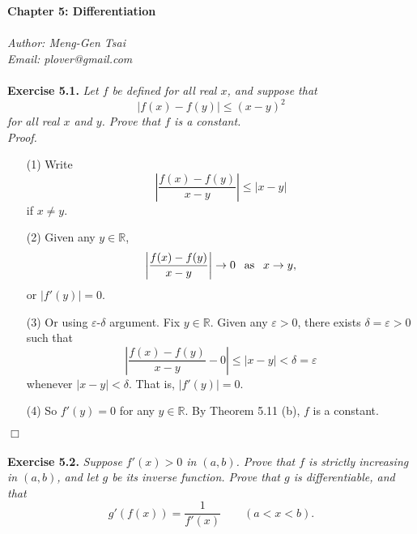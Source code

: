 \documentclass{article}
\begin{document}
\textbf{\Large Chapter 5: Differentiation} \\\\



\emph{Author: Meng-Gen Tsai} \\
\emph{Email: plover@gmail.com} \\\\






\textbf{Exercise 5.1.}
\emph{Let $f$ be defined for all real $x$, and suppose that
$$|f(x) - f(y)| \leq (x - y)^2$$
for all real $x$ and $y$. Prove that $f$ is a constant.} \\

\emph{Proof.}
\begin{enumerate}
\item[(1)]
Write
\[
  \left| \frac{f(x) - f(y)}{x - y} \right| \leq |x - y|
\]
if $x \neq y$.

\item[(2)]
Given any $y \in \mathbb{R}$,
\[
  \abs{ \frac{f(x) - f(y)}{x - y} } \to 0 \:\: \text{ as } \:\: x \to y,
\]
or $|f'(y)| = 0$.

\item[(3)]
Or using $\varepsilon$-$\delta$ argument. Fix $y \in \mathbb{R}$.
Given any $\varepsilon > 0$, there exists $\delta = \varepsilon > 0$ such that
$$\left| \frac{f(x) - f(y)}{x - y} - 0 \right| \leq |x - y| < \delta = \varepsilon$$
whenever $|x - y| < \delta$. That is, $|f'(y)| = 0$.

\item[(4)]
So $f'(y) = 0$ for any $y \in \mathbb{R}$.
By Theorem 5.11 (b), $f$ is a constant.
\end{enumerate}
$\Box$ \\\\






\textbf{Exercise 5.2.}
\emph{Suppose $f'(x)>0$ in $(a,b)$.
Prove that $f$ is strictly increasing in $(a,b)$, and let $g$ be its inverse function.
Prove that $g$ is differentiable, and that
\[
  g'(f(x)) = \frac{1}{f'(x)} \qquad (a<x<b).
\]}
\end{document}
